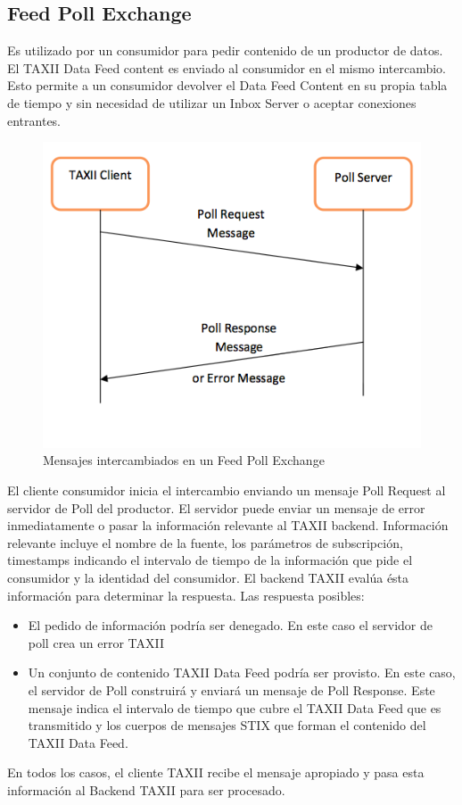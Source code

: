 \subsection{Feed Poll Exchange}

Es utilizado por un consumidor para pedir contenido de un productor de datos. El 
TAXII Data Feed content es enviado al consumidor en el mismo intercambio. Esto  
permite a un consumidor devolver el Data Feed Content en su propia tabla de 
tiempo y sin necesidad de utilizar un Inbox Server o aceptar conexiones 
entrantes.

\begin{figure}[ht!]
  \centering
    \includegraphics[width=150mm]{./images/FeedPollExchange.png}
    \caption{Mensajes intercambiados en un Feed Poll Exchange \protect\cite{b1}}
\end{figure}

El cliente consumidor inicia el intercambio enviando un mensaje Poll Request al 
servidor de Poll del productor. El servidor puede enviar un mensaje de error 
inmediatamente o pasar la información relevante al TAXII backend. Información 
relevante incluye el nombre de la fuente, los parámetros de subscripción, 
timestamps indicando el intervalo de tiempo de la información que pide el 
consumidor y la identidad del consumidor. El backend TAXII evalúa ésta
información para determinar la respuesta. Las respuesta posibles:
\begin{itemize}
  \item El pedido de información podría ser denegado. En este caso el servidor 
  de poll crea un error TAXII 
  \item Un conjunto de contenido TAXII Data Feed podría ser provisto. En este 
  caso, el servidor de Poll construirá y enviará un mensaje de Poll Response. 
  Este mensaje indica el intervalo de tiempo que cubre el TAXII Data Feed que es 
  transmitido y los cuerpos de mensajes STIX que forman el contenido del TAXII 
  Data Feed.
\end{itemize}
En todos los casos, el cliente TAXII recibe el mensaje apropiado y pasa esta 
información al Backend TAXII para ser procesado.


